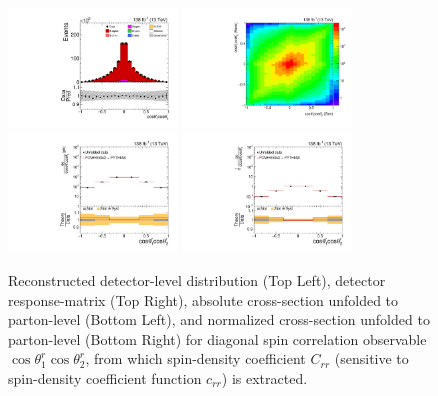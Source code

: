 \clearpage
\begin{figure}[htb]
\begin{center}
 \includegraphics[width=0.40\textwidth]{fig_fullRun2UL/controlplots/combined/Hyp_LLBarCrr.pdf}
 \includegraphics[width=0.40\textwidth]{fig_fullRun2UL/unfolding/combined/ResponseMatrix_c_rr.pdf} \\
 \includegraphics[width=0.40\textwidth]{fig_fullRun2UL/unfolding/combined/UnfoldedResults_c_rr.pdf}
 \includegraphics[width=0.40\textwidth]{fig_fullRun2UL/unfolding/combined/UnfoldedResultsNorm_c_rr.pdf} \\
\label{fig:c_rr}
\caption{Reconstructed detector-level distribution (Top Left), detector response-matrix (Top Right), absolute cross-section unfolded to parton-level (Bottom Left), and normalized cross-section unfolded to parton-level (Bottom Right) for diagonal spin correlation observable $\cos\theta_{1}^{r}\cos\theta_{2}^{r}$, from which spin-density coefficient $C_{rr}$ (sensitive to spin-density coefficient function $c_{r r}$) is extracted.}
\end{center}
\end{figure}
